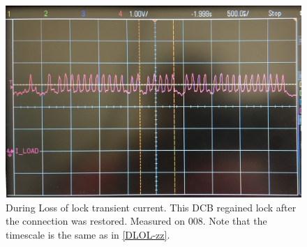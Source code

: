 \documentclass[11pt,letterpaper]{refart}
\begin{document}
\begin{figure}[ht]
    \centering
    \includegraphics[width=0.8\linewidth]
        {./res/current_transient/during_loss_of_lock-recoverable.jpg}
    \caption[During loss of lock transient current, recoverable]{
        During Loss of lock transient current.
        This DCB regained lock after the connection was restored.
        Measured on 008.
        Note that the timescale is the same as in \autoref{DLOL-zz}.
    }
\end{figure}
\end{document}
